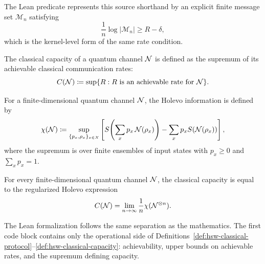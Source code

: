 \documentclass[10pt,a4paper]{article}
\begin{document}
The Lean predicate represents this source shorthand by an explicit finite
message set $\mathcal M_n$ satisfying
\begin{equation}
    \frac{1}{n}\log|\mathcal M_n|\ge R-\delta,
\end{equation}
which is the kernel-level form of the same rate condition.

\begin{definition}
    \label{def:hsw-classical-capacity}
    The classical capacity of a quantum channel ${\cal N}$ is defined as the
    supremum of its achievable classical communication rates:
    \begin{equation}
        C({\cal N})
        \coloneqq
        \sup\{R:R\mathrm{~is~an~achievable~rate~for~}{\cal N}\}.
    \end{equation}
\end{definition}

\begin{definition}
    \label{def:hsw-holevo-information}
    For a finite-dimensional quantum channel ${\cal N}$, the Holevo information
    is defined by
    \begin{equation}
            \chi({\cal N})
            \coloneqq
            \sup_{\{p_x,\rho_x\}_{x\in\mathcal X}}
            \left[
            S\!\left(\sum_x p_x\,{\cal N}(\rho_x)\right)
            -\sum_x p_x S({\cal N}(\rho_x))
            \right],
    \end{equation}
    where the supremum is over finite ensembles of input states with
    $p_x\ge0$ and $\sum_xp_x=1$.
\end{definition}

\begin{theorem}
    \label{thm:hsw-capacity}
    For every finite-dimensional quantum channel ${\cal N}$, the classical capacity
    is equal to the regularized Holevo expression
    \begin{equation}
        C({\cal N})
        =
        \lim_{n\to\infty}\frac{1}{n}\chi({\cal N}^{\otimes n}).
    \end{equation}
\end{theorem}

The Lean formalization follows the same separation as the mathematics.  The
first code block contains only the operational side of
Definitions~\ref{def:hsw-classical-protocol}--\ref{def:hsw-classical-capacity}:
achievability, upper bounds on achievable rates, and the supremum defining
capacity.
	
\end{document}
